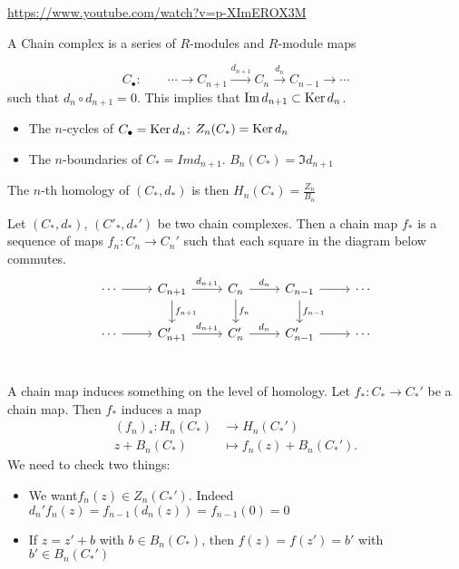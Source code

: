 \url{https://www.youtube.com/watch?v=p-XImEROX3M}


\begin{definition}
    A Chain complex is a series of $R$-modules and $R$-module maps

    \[
    C_{\bullet}: \qquad \cdots \to  C_{n+1} \xrightarrow{d_{n+1}}   C_n \xrightarrow{d_n}   C_{n-1} \to  \cdots
    \] 
    such that $d_n  \circ  d_{n+1} = 0$.
    This implies that $\operatorname{Im} d_{n+1} \subset \operatorname{Ker} d_n$.
    \begin{itemize}
        \item The $n$-cycles of $C_\bullet = \operatorname{Ker} d_n$:  $Z_n(C_*) = \operatorname{Ker} d_n$
        \item The  $n$-boundaries of $C_* = Im d_{n+1}$. $B_n(C_*) = \Im d_{n+1}$
    \end{itemize}
    The $n$-th homology of $(C_*, d_*)$ is then  $H_n(C_*) = \frac{Z_n}{B_n}$
\end{definition}

\begin{definition}
    Let $(C_*, d_*)$,  $(C'_*, d_*')$ be two chain complexes. Then a chain map $f_*$ is a sequence of maps $f_n: C_n \to  C_n'$ such that each square in the diagram below commutes.
    \[
        \begin{tikzcd}
            \cdots \arrow[r, " "] & C_{n+1} \arrow[r, " d_{n+1}"] \arrow[d, "f_{n+1}"]& C_n \arrow[r, "d_n"] \arrow[d, "f_n"]&C_{n-1} \arrow[d, "f_{n-1}"] \arrow[r, ""]& \cdots\\
            \cdots \arrow[r, ""]  & C_{n+1}' \arrow[r, " d_{n+1}"] & C_n' \arrow[r, "d_n"] &C_{n-1}' \arrow[r, ""] & \cdots\\
        \end{tikzcd}
    \]
\end{definition}

A chain map induces something on the level of homology.
Let $f_*: C_* \to  C_*'$ be a chain map. Then $f_*$ induces a map
\begin{align*}
    (f_n)_*: H_n(C_*) &\longrightarrow H_n(C_*') \\
    z + B_n(C_*) &\longmapsto f_n(z) + B_n(C_*')
.\end{align*}
We need to check two things:
\begin{itemize}
    \item We want$f_n(z) \in Z_n(C_*')$. Indeed $d_n' f_n(z) = f_{n-1} (d_n (z) )= f_{n-1}(0) = 0$

    \item If $z = z' + b$ with $b \in B_n(C_*)$, then $f(z) = f(z') = b'$ with  $b' \in B_n(C_*')$
\end{itemize}

